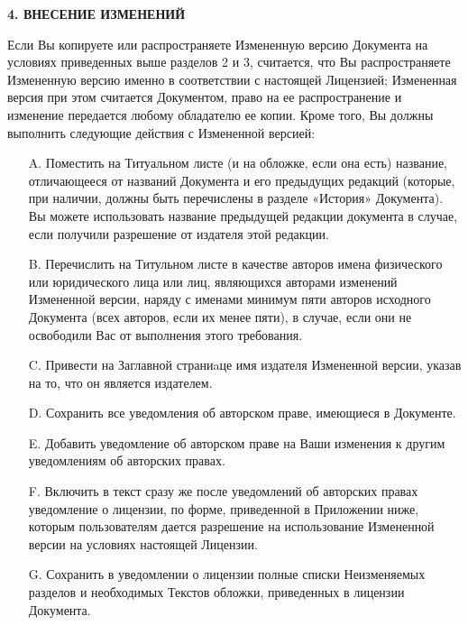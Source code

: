 \begin{center}
{\Large\bf 4. ВНЕСЕНИЕ ИЗМЕНЕНИЙ\par}
\end{center}

Если Вы копируете или распространяете Измененную версию Документа на
условиях приведенных выше разделов 2 и 3, считается, что Вы
распространяете Измененную версию именно в соответствии с настоящей
Лицензией; Измененная версия при этом считается Документом, право на
ее распространение и изменение передается любому обладателю ее
копии. Кроме того, Вы должны выполнить следующие действия с Измененной
версией:

\begin{itemize}
\item[A.]
Поместить на Титуальном листе (и на обложке, если она есть) название,
отличающееся от названий Документа и его предыдущих редакций (которые,
при наличии, должны быть перечислены в разделе «История»
Документа). Вы можете использовать название предыдущей редакции
документа в случае, если получили разрешение от издателя этой
редакции.

\item[B.]
Перечислить на Титульном листе в качестве авторов имена физического
или юридического лица или лиц, являющихся авторами изменений
Измененной версии, наряду с именами минимум пяти авторов исходного
Документа (всех авторов, если их менее пяти), в случае, если они не
освободили Вас от выполнения этого требования.

\item[C.]
Привести на Заглавной страниaце имя издателя Измененной версии, указав
на то, что он является издателем.

\item[D.]
Сохранить все уведомления об авторском праве, имеющиеся в Документе.

\item[E.]
Добавить уведомление об авторском праве на Ваши изменения к другим
уведомлениям об авторских правах.

\item[F.]
Включить в текст сразу же после уведомлений об авторских правах
уведомление о лицензии, по форме, приведенной в Приложении ниже,
которым пользователям дается разрешение на использование Измененной
версии на условиях настоящей Лицензии.

\item[G.]
Сохранить в уведомлении о лицензии полные списки Неизменяемых разделов
и необходимых Текстов обложки, приведенных в лицензии Документа.


\end{itemize}
